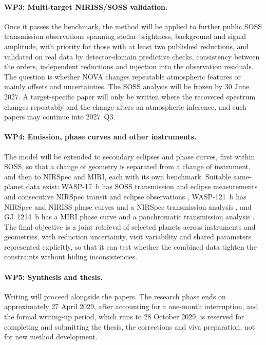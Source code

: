 \paragraph{WP3: Multi-target NIRISS/SOSS validation.}
Once it passes the benchmark, the method will be applied to further public
SOSS transmission observations spanning stellar brightness, background and signal amplitude,
with priority for those with at least two published reductions, and
validated on real data by detector-domain predictive checks, consistency
between the orders, independent reductions and injection into the observation
residuals. The question is whether
NOVA changes repeatable atmospheric features or mainly offsets and
uncertainties.
The SOSS analysis will be frozen by 30 June 2027. A target-specific paper will
only be written where the recovered spectrum changes repeatably and the change
alters an atmospheric inference, and such papers may continue into 2027~Q3.

\paragraph{WP4: Emission, phase curves and other instruments.}
The model will be extended to secondary eclipses and phase curves, first
within SOSS, so that a change of geometry is separated from a change of
instrument, and then to NIRSpec and MIRI, each with its own benchmark. Suitable same-planet data exist: WASP-17~b has SOSS
transmission and eclipse measurements and consecutive NIRSpec transit and
eclipse observations \citep{LouieEtAl2025,GressierEtAl2024,
LustigYaegerEtAl2025}, WASP-121~b has NIRSpec and NIRISS phase curves and a
NIRSpec transmission analysis \citep{MikalEvansEtAl2023,GappEtAl2025,
SplinterEtAl2025}, and GJ~1214~b has a MIRI phase curve and a panchromatic
transmission analysis \citep{KemptonEtAl2023,OhnoEtAl2025}. The final
objective is a joint retrieval of selected planets across instruments and
geometries, with reduction uncertainty, visit variability and shared
parameters represented explicitly, so that it can test whether the combined
data tighten the constraints without hiding inconsistencies.

\paragraph{WP5: Synthesis and thesis.}
Writing will proceed alongside the papers. The research phase ends on approximately 27 April 2029, after accounting for
a one-month interruption, and the formal writing-up period, which runs to
28 October 2029, is reserved for completing and submitting the thesis, the
corrections and viva preparation, not for new method development.

